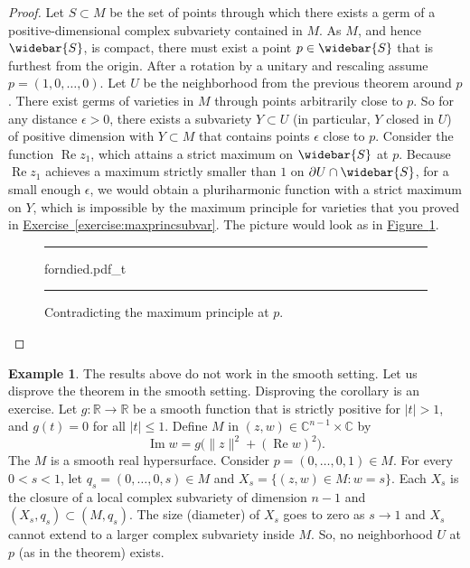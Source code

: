 \documentclass[12pt,openany]{book}
\renewcommand{\Re}{\operatorname{Re}}
\renewcommand{\Im}{\operatorname{Im}}
\newcommand{\sabs}[1]{\lvert {#1} \rvert}
\newcommand{\snorm}[1]{\lVert {#1} \rVert}
\newcommand{\C}{{\mathbb{C}}}
\newcommand{\R}{{\mathbb{R}}}
\theoremstyle{plain}
\theoremstyle{remark}
\theoremstyle{definition}
\newenvironment{myfig}{%
\begin{figure}[h!t]
\noindent\rule{\textwidth}{0.5pt}\vspace{12pt}\par\centering}%
{\par\noindent\rule{\textwidth}{0.5pt}
\end{figure}}
\theoremstyle{exercise}
\theoremstyle{example}
\newtheorem{example}[thm]{Example}
\newcommand{\figureref}[1]{\hyperref[#1]{Figure~\ref*{#1}}}
\newcommand{\exerciseref}[1]{\hyperref[#1]{Exercise~\ref*{#1}}}
\begin{document}
\begin{proof}
Let $S \subset M$ be the set of points through which there exists
a germ of a positive-dimensional complex subvariety contained in $M$.
As $M$, and hence $\widebar{S}$, is compact,
there must exist a point $p \in \widebar{S}$
that is furthest from
the origin.  After a rotation by a unitary and rescaling assume
$p=(1,0,\ldots,0)$.  Let $U$ be the neighborhood from the previous
theorem around $p$.  There exist germs of varieties in $M$ through points
arbitrarily close to $p$.  So for any distance $\epsilon > 0$,
there exists a subvariety $Y \subset U$ (in particular, $Y$ closed in $U$)
of positive dimension with $Y \subset M$ that contains points
$\epsilon$ close to $p$.  Consider the function $\Re z_1$, which attains a
strict maximum on $\widebar{S}$ at $p$.  Because $\Re z_1$ achieves a maximum
strictly smaller than $1$ on $\partial U \cap \widebar{S}$, for a small enough $\epsilon$,
we would obtain a pluriharmonic function with a strict
maximum on $Y$, which is impossible by the maximum principle for
varieties that you proved in \exerciseref{exercise:maxprincsubvar}.
The picture would look as in \figureref{fig:forndied}.
\begin{myfig}
\medskip
{forndied.pdf_t}
\caption{Contradicting the maximum principle at $p$.\label{fig:forndied}}
\end{myfig}
\end{proof}

\begin{example}
The results above do not work
in the smooth setting.  Let us disprove the theorem in the smooth
setting.  Disproving the corollary is an exercise.
Let $g \colon \R \to \R$ be a smooth function that is
strictly positive for $\sabs{t} > 1$, and $g(t) = 0$ for all $\sabs{t} \leq 1$.
Define $M$ in $(z,w) \in \C^{n-1} \times \C$ by
\begin{equation*}
\Im w = g\bigl(\snorm{z}^2 + (\Re w)^2\bigr) .
\end{equation*}
The $M$ is a smooth real hypersurface.
Consider $p = (0,\ldots,0,1) \in M$.  For every $0 < s < 1$, let
$q_s = (0,\ldots,0,s) \in M$ and $X_s = \bigl\{ (z,w) \in M :
w = s \bigr\}$.  Each $X_s$ is the closure of a local complex subvariety of dimension $n-1$
and $(X_s,q_s) \subset (M,q_s)$.  The size (diameter) of $X_s$ goes to
zero as $s \to 1$ and $X_s$ cannot extend to a
larger complex subvariety inside $M$.  So, no neighborhood $U$ at
$p$ (as in the theorem) exists.
\end{example}
\end{document}
